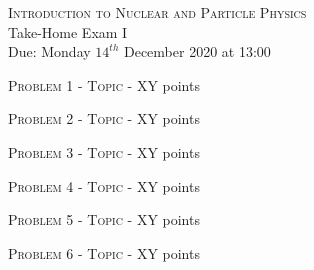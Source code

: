\documentclass[a4paper,11pt]{report}
\begin{document}
\begin{center}
{\large \textsc{Introduction to Nuclear and Particle Physics}} \\[0.5cm]
\Large{Take-Home Exam I\\
Due: Monday $14^{th}$ December 2020 at 13:00}
\end{center}

{\large \textsc{Problem 1 - Topic} - XY points}

{\large \textsc{Problem 2 - Topic} - XY points}

{\large \textsc{Problem 3 - Topic} - XY points}

{\large \textsc{Problem 4 - Topic} - XY points}

{\large \textsc{Problem 5 - Topic} - XY points}

{\large \textsc{Problem 6 - Topic} - XY points}
\end{document}
